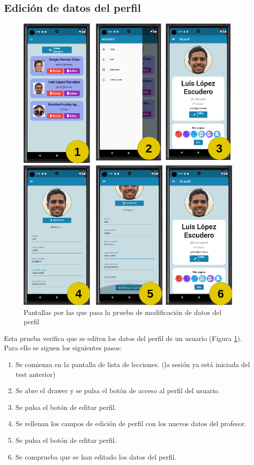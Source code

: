 \newpage


\subsection{Edición de datos del perfil}

\begin{figure}[H]
    \centering
    \includegraphics[width=\textwidth]{imagenes/c8/testint2.png}
    \caption{Pantallas por las que pasa la prueba de modificación de datos del perfil}
    \label{fig:prueba_edicion_perfil}
\end{figure}

Esta prueba verifica que se editen los datos del perfil de un usuario (Figura \ref{fig:prueba_edicion_perfil}). Para ello se siguen los siguientes pasos:

\begin{enumerate}
    \item Se comienza en la pantalla de lista de lecciones. (la sesión ya está iniciada del test anterior)
    \item Se abre el drawer y se pulsa el botón de acceso al perfil del usuario.
    \item Se pulsa el botón de editar perfil.
    \item Se rellenan los campos de edición de perfil con los nuevos datos del profesor.
    \item Se pulsa el botón de editar perfil.
    \item Se comprueba que se han editado los datos del perfil.
\end{enumerate}




